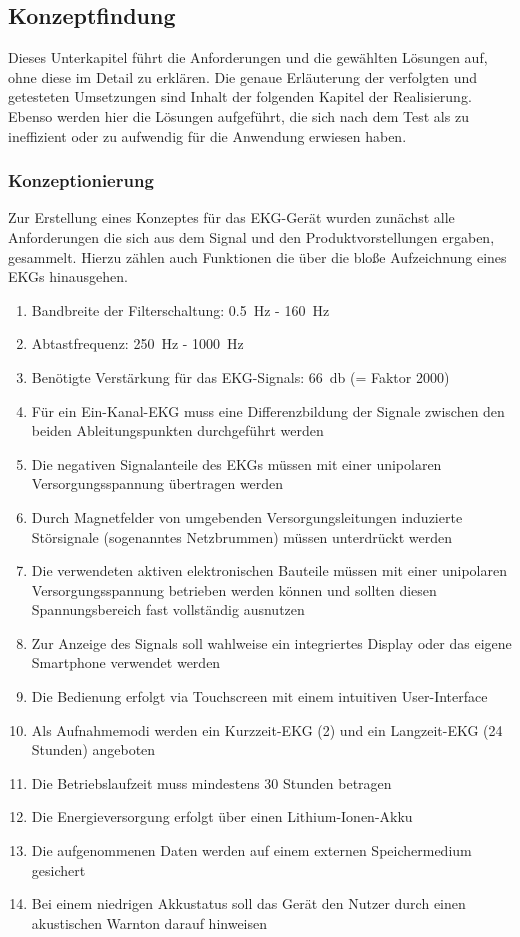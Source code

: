 
\subsection{Konzeptfindung}

Dieses Unterkapitel führt die Anforderungen und die gewählten Lösungen auf, ohne diese im Detail zu erklären. Die genaue Erläuterung der verfolgten und getesteten Umsetzungen sind Inhalt der folgenden Kapitel der Realisierung. Ebenso werden hier die Lösungen aufgeführt, die sich nach dem Test als zu ineffizient oder zu aufwendig für die Anwendung erwiesen haben.

\subsubsection{Konzeptionierung}

Zur Erstellung eines Konzeptes für das EKG-Gerät wurden zunächst alle Anforderungen die sich aus dem Signal und den Produktvorstellungen ergaben, gesammelt. Hierzu zählen auch Funktionen die über die bloße Aufzeichnung eines EKGs hinausgehen.

\begin{enumerate}
\item Bandbreite der Filterschaltung: \SI{0.5}{\hertz} - \SI{160}{\hertz}
\item Abtastfrequenz: \SI{250}{\hertz} - \SI{1000}{\hertz}
\item Benötigte Verstärkung für das EKG-Signals: \SI{66}{\decibel} (= Faktor 2000)
\item Für ein Ein-Kanal-EKG muss eine Differenzbildung der Signale zwischen den beiden Ableitungspunkten durchgeführt werden
\item Die negativen Signalanteile des EKGs müssen mit einer unipolaren Versorgungsspannung übertragen werden
\item Durch Magnetfelder von umgebenden Versorgungsleitungen induzierte Störsignale (sogenanntes Netzbrummen) müssen unterdrückt werden
\item Die verwendeten aktiven elektronischen Bauteile müssen mit einer unipolaren Versorgungsspannung betrieben werden können und sollten diesen Spannungsbereich fast vollständig ausnutzen
\item Zur Anzeige des Signals soll wahlweise ein integriertes Display oder das eigene Smartphone verwendet werden
\item Die Bedienung erfolgt via Touchscreen mit einem intuitiven User-Interface
\item Als Aufnahmemodi werden ein Kurzzeit-EKG (\SI{2}{\min}) und ein Langzeit-EKG (24 Stunden) angeboten
\item Die Betriebslaufzeit muss mindestens 30 Stunden betragen
\item Die Energieversorgung erfolgt über einen Lithium-Ionen-Akku
\item Die aufgenommenen Daten werden auf einem externen Speichermedium gesichert
\item Bei einem niedrigen Akkustatus soll das Gerät den Nutzer durch einen akustischen Warnton darauf hinweisen
\end{enumerate}

